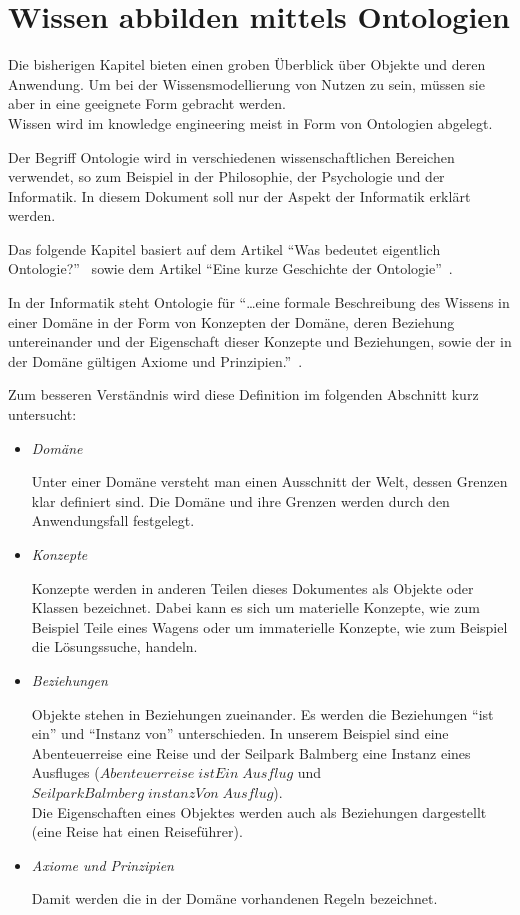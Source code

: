 \chapter{Wissen abbilden mittels Ontologien}
\label{chap:ontologien}

Die bisherigen Kapitel bieten einen groben Überblick über Objekte und deren Anwendung. Um bei der Wissensmodellierung von Nutzen zu sein, müssen sie aber in eine geeignete Form gebracht werden.\\
Wissen wird im knowledge engineering meist in Form von Ontologien abgelegt.

Der Begriff Ontologie wird in verschiedenen wissenschaftlichen Bereichen verwendet, so zum Beispiel in der Philosophie, der Psychologie und der Informatik. In diesem Dokument soll nur der Aspekt der Informatik erklärt werden.

Das folgende Kapitel basiert auf dem Artikel ``Was bedeutet eigentlich Ontologie?''~\cite{IspekOntoBedeutung} sowie dem Artikel ``Eine kurze Geschichte der Ontologie''~\cite{ISpekOntoGeschichte}.

In der Informatik steht Ontologie für ``\ldots eine formale Beschreibung des Wissens in einer Domäne in der Form von Konzepten der Domäne, deren Beziehung untereinander und der Eigenschaft dieser Konzepte und Beziehungen, sowie der in der Domäne gültigen Axiome und Prinzipien.''~\cite[S.310]{ISpekOntoGeschichte}.

Zum besseren Verständnis wird diese Definition im folgenden Abschnitt kurz untersucht:
\begin{itemize}
    \item \textit{Domäne}

        Unter einer Domäne versteht man einen Ausschnitt der Welt, dessen Grenzen klar definiert sind. Die Domäne und ihre Grenzen werden durch den Anwendungsfall festgelegt.

    \item \textit{Konzepte}

        Konzepte werden in anderen Teilen dieses Dokumentes als Objekte oder Klassen bezeichnet. Dabei kann es sich um materielle Konzepte, wie zum Beispiel Teile eines Wagens oder um immaterielle Konzepte, wie zum Beispiel die Lösungssuche, handeln.

    \item \textit{Beziehungen}

        Objekte stehen in Beziehungen zueinander. Es werden die Beziehungen ``ist ein'' und ``Instanz von'' unterschieden. In unserem Beispiel sind eine Abenteuerreise eine Reise und der Seilpark Balmberg eine Instanz eines Ausfluges ($Abenteuerreise\;istEin\;Ausflug$ und $SeilparkBalmberg\;instanzVon\;Ausflug$).\\
        Die Eigenschaften eines Objektes werden auch als Beziehungen dargestellt (eine Reise hat einen Reiseführer).

    \item \textit{Axiome und Prinzipien}

        Damit werden die in der Domäne vorhandenen Regeln bezeichnet.
\end{itemize}

